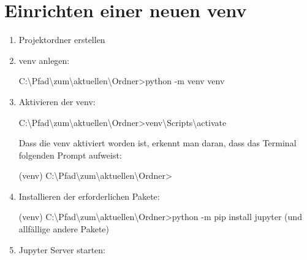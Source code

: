 \documentclass[
  nswissgerman,
  a4paper,
  DIV=11,
  numbers=noendperiod,
  ngerman]{scrreprt}
\newenvironment{Shaded}{\begin{snugshade}}{\end{snugshade}}
\newcommand{\NormalTok}[1]{\textcolor[rgb]{0.00,0.23,0.31}{#1}}
\begin{document}
\section{Einrichten einer neuen venv}\label{einrichten-einer-neuen-venv}

\begin{enumerate}
\def\labelenumi{\arabic{enumi}.}
\item
  Projektordner erstellen
\item
  venv anlegen:

\begin{Shaded}
\begin{Highlighting}[numbers=left,,]
\NormalTok{C:\textbackslash{}Pfad\textbackslash{}zum\textbackslash{}aktuellen\textbackslash{}Ordner\textgreater{}python {-}m venv venv}
\end{Highlighting}
\end{Shaded}
\item
  Aktivieren der venv:

\begin{Shaded}
\begin{Highlighting}[numbers=left,,]
\NormalTok{C:\textbackslash{}Pfad\textbackslash{}zum\textbackslash{}aktuellen\textbackslash{}Ordner\textgreater{}venv\textbackslash{}Scripts\textbackslash{}activate}
\end{Highlighting}
\end{Shaded}

  Dass die venv aktiviert worden ist, erkennt man daran, dass das
  Terminal folgenden Prompt aufweist:

\begin{Shaded}
\begin{Highlighting}[numbers=left,,]
\NormalTok{(venv) C:\textbackslash{}Pfad\textbackslash{}zum\textbackslash{}aktuellen\textbackslash{}Ordner\textgreater{}}
\end{Highlighting}
\end{Shaded}
\item
  Installieren der erforderlichen Pakete:

\begin{Shaded}
\begin{Highlighting}[numbers=left,,]
\NormalTok{(venv) C:\textbackslash{}Pfad\textbackslash{}zum\textbackslash{}aktuellen\textbackslash{}Ordner\textgreater{}python {-}m pip install jupyter (und allfällige andere Pakete)}
\end{Highlighting}
\end{Shaded}
\item
  Jupyter Server starten:


\end{enumerate}
\end{document}
